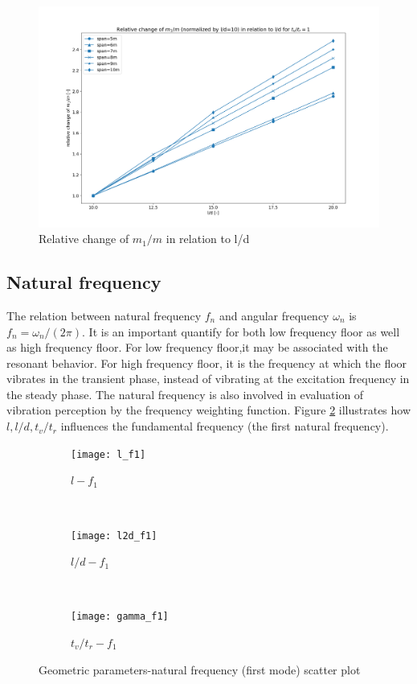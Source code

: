 \begin{figure}
  \centering
  \includegraphics[width=0.9\linewidth]{images/m12m_change}
  \caption{Relative change of $m_1/m$ in relation to l/d}
  \label{fig:m12m_change}
\end{figure}

\subsection{Natural frequency}
\label{subsec:natural frequency}
The relation between natural frequency $f_n$ and angular frequency $\omega_n$ is $f_n=\omega_n/(2\pi)$. It is an important quantify for both low frequency floor as well as high frequency floor. For low frequency floor,it may be associated with the resonant behavior. For high frequency floor, it is the frequency at which the floor vibrates in the transient phase, instead of vibrating at the excitation frequency in the steady phase. The natural frequency is also involved in evaluation of vibration perception by the frequency weighting function. Figure \ref{fig:geom-f1} illustrates how $l, l/d, t_v/t_r$ influences the fundamental frequency (the first natural frequency). 
\begin{figure}[H]
\begin{subfigure}[b]{.32\textwidth}
  \centering
  \texttt{[image: l\_f1]}
  \caption{$l-f_1$}
\end{subfigure}
~
\begin{subfigure}[b]{.32\textwidth}
  \centering
  \texttt{[image: l2d\_f1]}
  \caption{$l/d-f_1$}
\end{subfigure}
~
\begin{subfigure}[b]{.32\textwidth}
  \centering
  \texttt{[image: gamma\_f1]}
  \caption{$t_v/t_r-f_1$}
\end{subfigure}

\caption{Geometric parameters-natural frequency (first mode) scatter plot}
\label{fig:geom-f1}
\end{figure} 

